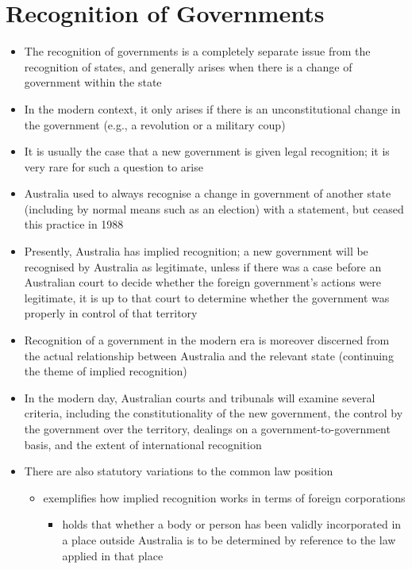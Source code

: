 \section{Recognition of Governments}
\begin{itemize}
    \item The recognition of governments is a completely separate issue from the recognition of states, and generally arises when there is a change of government within the state
    \item In the modern context, it only arises if there is an unconstitutional change in the government (e.g., a revolution or a military coup)
    \item It is usually the case that a new government is given legal recognition; it is very rare for such a question to arise
    \item Australia used to always recognise a change in government of another state (including by normal means such as an election) with a statement, but ceased this practice in 1988
    \item Presently, Australia has implied recognition; a new government will be recognised by Australia as legitimate, unless if there was a case before an Australian court to decide whether the foreign government's actions were legitimate, it is up to that court to determine whether the government was properly in control of that territory
    \item Recognition of a government in the modern era is moreover discerned from the actual relationship between Australia and the relevant state (continuing the theme of implied recognition)
    \item In the modern day, Australian courts and tribunals will examine several criteria, including the constitutionality of the new government, the control by the government over the territory, dealings on a government-to-government basis, and the extent of international recognition
    \item There are also statutory variations to the common law position
    \begin{itemize}
        \item {} exemplifies how implied recognition works in terms of foreign corporations
        \begin{itemize}
            \item {} holds that whether a body or person has been validly incorporated in a place outside Australia is to be determined by reference to the law applied in that place

\end{itemize}
\end{itemize}
\end{itemize}
